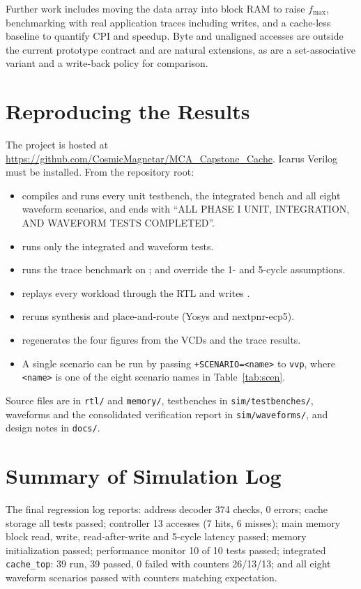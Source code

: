 \documentclass[conference,a4paper]{IEEEtran}
\begin{document}
Further work includes moving the data array into block RAM to raise $f_{\max}$, benchmarking with real application traces including writes, and a cache-less baseline to quantify CPI and speedup. Byte and unaligned accesses are outside the current prototype contract and are natural extensions, as are a set-associative variant and a write-back policy for comparison.

\appendices
\section{Reproducing the Results}\label{app:repro}
The project is hosted at \url{https://github.com/CosmicMagnetar/MCA_Capstone_Cache}. Icarus Verilog \cite{icarus} must be installed. From the repository root:
\begin{itemize}
\item {} compiles and runs every unit testbench, the integrated bench and all eight waveform scenarios, and ends with ``ALL PHASE I UNIT, INTEGRATION, AND WAVEFORM TESTS COMPLETED''.
\item {} runs only the integrated and waveform tests.
\item {} runs the trace benchmark \cite{script} on  \cite{traces};  and  override the 1- and 5-cycle assumptions.
\item {} replays every workload through the RTL and writes .
\item {} reruns synthesis and place-and-route (Yosys and nextpnr-ecp5).
\item {} regenerates the four figures from the VCDs and the trace results.
\item A single scenario can be run by passing \texttt{+SCENARIO=<name>} to \texttt{vvp}, where \texttt{<name>} is one of the eight scenario names in Table~\ref{tab:scen}.
\end{itemize}
Source files are in \texttt{rtl/} and \texttt{memory/}, testbenches in \texttt{sim/testbenches/}, waveforms and the consolidated verification report in \texttt{sim/waveforms/}, and design notes in \texttt{docs/}.

\section{Summary of Simulation Log}
The final regression log reports: address decoder 374 checks, 0 errors; cache storage all tests passed; controller 13 accesses (7 hits, 6 misses); main memory block read, write, read-after-write and 5-cycle latency passed; memory initialization passed; performance monitor 10 of 10 tests passed; integrated \texttt{cache\_top}: 39 run, 39 passed, 0 failed with counters 26/13/13; and all eight waveform scenarios passed with counters matching expectation.
\end{document}

